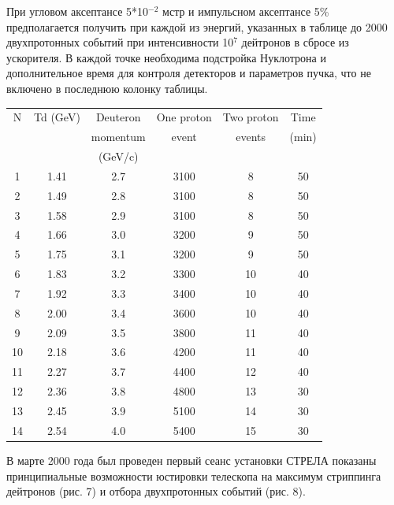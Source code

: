 \documentclass[a4paper,12pt]{article}
\begin{document}
{{        \vspace {10mm}

        При угловом аксептансе 5*10$^{-2}$ мстр и импульсном аксептансе 5\%
        пред\-полагается получить при каж\-дой из энергий, указанных
        в таблице до 2000 двухпротонных событий при интенсивности
        10$^7$ дейтронов в сбросе из ускорителя. В каждой точке необходима
        подстройка Нуклотрона и дополнительное время для контроля детекторов
        и параметров пучка, что не включено в последнюю колонку таблицы.

        \begin{tabular}{|c|c|c|c|c|c|}    \hline
          N    &  Td (GeV)&       Deuteron & One proton & Two proton & Time \\
          & &        momentum  & event  & events  & (min) \\
          & &(GeV/c)&     &       &       \\ \hline
          1   &   1.41 &  2.7  &  3100 &  8  &    50 \\  \hline
          2   &   1.49 &  2.8  &  3100 &  8  &    50 \\  \hline
          3   &   1.58 &  2.9  &  3100 &  8  &    50 \\  \hline
          4   &   1.66 &  3.0  &  3200 &  9  &    50 \\  \hline
          5   &   1.75 &  3.1  &  3200 &  9  &    50 \\  \hline
          6   &   1.83 &  3.2  &  3300 &  10 &    40 \\  \hline
          7   &   1.92 &  3.3 &   3400 &  10 &    40 \\  \hline
          8   &   2.00 &  3.4 &   3600 &  10 &    40 \\  \hline
          9   &   2.09 &  3.5 &   3800 &  11 &    40 \\  \hline
          10  &   2.18 &  3.6 &   4200 &  11 &    40 \\  \hline
          11  &   2.27 &  3.7 &   4400 &  12 &    40 \\  \hline
          12  &   2.36 &  3.8 &   4800 &  13 &    30 \\  \hline
          13  &   2.45 &  3.9 &   5100 &  14 &    30 \\  \hline
          14  &   2.54 &  4.0 &   5400 &  15 &    30 \\  \hline
        \end{tabular}
        \vspace*{5mm}

        В марте 2000 года был проведен первый сеанс установки СТРЕЛА
        показаны принципиальные возможности юстировки телескопа на
        максимум стриппинга дейтронов (рис. 7) и отбора двухпротонных
        событий (рис. 8).

}}
\end{document}
